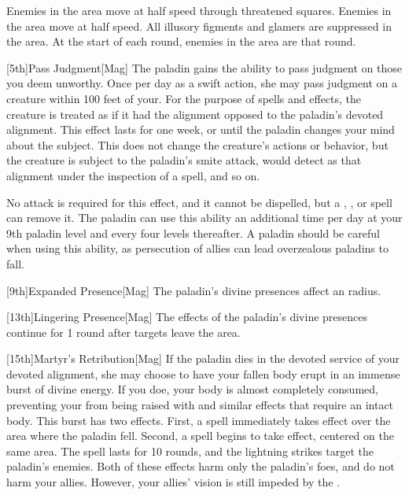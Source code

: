         Enemies in the area move at half speed through threatened squares.
        Enemies in the area move at half speed.
        All illusory figments and glamers are suppressed in the area.
        At the start of each round, enemies in the area are \immobilized that round.

        [5th]{Pass Judgment}[Mag]
        The paladin gains the ability to pass judgment on those you deem unworthy.
        Once per day as a swift action, she may pass judgment on a creature within 100 feet of your.
        For the purpose of spells and effects, the creature is treated as if it had the alignment opposed to the paladin's devoted alignment.
        This effect lasts for one week, or until the paladin changes your mind about the subject.
        This does not change the creature's actions or behavior, but the creature is subject to the paladin's smite attack, would detect as that alignment under the inspection of a  spell, and so on.

        No attack is required for this effect, and it cannot be dispelled, but a , , or  spell can remove it.
        The paladin can use this ability an additional time per day at your 9th paladin level and every four levels thereafter.
        A paladin should be careful when using this ability, as persecution of allies can lead overzealous paladins to fall.

        [9th]{Expanded Presence}[Mag]
        The paladin's divine presences affect an \arealarge radius.

        [13th]{Lingering Presence}[Mag]
        The effects of the paladin's divine presences continue for 1 round after targets leave the area.

        [15th]{Martyr's Retribution}[Mag]
        If the paladin dies in the devoted service of your devoted alignment, she may choose to have your fallen body erupt in an immense burst of divine energy.
        If you doe, your body is almost completely consumed, preventing your from being raised with  and similar effects that require an intact body.
        This burst has two effects.
        First, a  spell immediately takes effect over the area where the paladin fell.
        Second, a  spell begins to take effect, centered on the same area.
        The spell lasts for 10 rounds, and the lightning strikes target the paladin's enemies.
        Both of these effects harm only the paladin's foes, and do not harm your allies.
        However, your allies' vision is still impeded by the .

